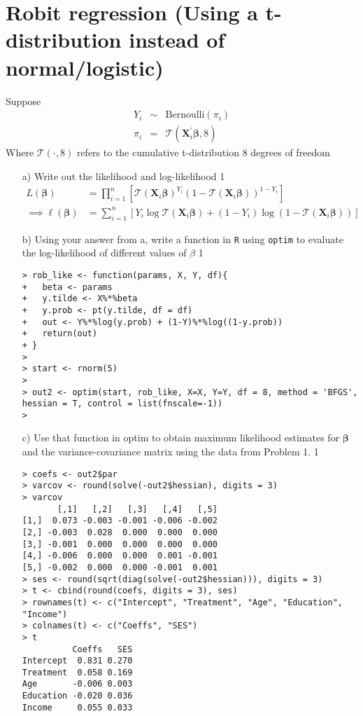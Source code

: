 \documentclass[letterpaper,12pt]{article}
\numberwithin{equation}{section}
\numberwithin{equation}{section}
\newcommand{\solutions}{1}
\begin{document}
\section{Robit regression (Using a t-distribution instead of normal/logistic) }
Suppose
\begin{eqnarray}
Y_{i} & \sim & \text{Bernoulli}(\pi_{i}) \nonumber \\
\pi_{i} & = & \mathcal{T}(\boldsymbol{X}_{i}^{'}\boldsymbol{\beta}, 8) \nonumber
\end{eqnarray}
Where $\mathcal{T}(\cdot, 8)$ refers to the cumulative t-distribution 8 degrees of freedom
\begin{itemize}
\item[a)] Write out the likelihood and log-likelihood
\if\solutions1
{\color{red}
\begin{align*}
  L(\bm \beta)
  &= \prod_{i=1}^n \left[ \mathcal{T}(\bm X_i \bm \beta)^{Y_i} \left(1 - \mathcal{T}(\bm X_i \bm \beta) \right)^{1 - Y_i}  \right]
  \\
  \implies \ell(\bm \beta)
  &= \sum_{i=1}^n \left[ Y_i \log\mathcal{T}(\bm X_i \bm \beta) + (1 - Y_i)\log\left(1 - \mathcal{T}(\bm X_i \bm \beta) \right)\right]
\end{align*}
}
\fi
\item[b)] Using your answer from a, write a function in {\tt R} using {\tt optim} to evaluate the log-likelihood of different values of $\beta$
\if \solutions1
{\color{red}
\begin{verbatim}
> rob_like <- function(params, X, Y, df){
+   beta <- params
+   y.tilde <- X%*%beta
+   y.prob <- pt(y.tilde, df = df) 
+   out <- Y%*%log(y.prob) + (1-Y)%*%log((1-y.prob))
+   return(out)
+ }
> 
> start <- rnorm(5)
> 
> out2 <- optim(start, rob_like, X=X, Y=Y, df = 8, method = 'BFGS', hessian = T, control = list(fnscale=-1))
> 
\end{verbatim}
}
\fi

\item[c)] Use that function in optim to obtain maximum likelihood estimates for $\boldsymbol{\beta}$ and the variance-covariance matrix using the data from Problem 1.
\if \solutions1
{\color{red}
\begin{verbatim}
> coefs <- out2$par
> varcov <- round(solve(-out2$hessian), digits = 3)
> varcov
       [,1]   [,2]   [,3]   [,4]   [,5]
[1,]  0.073 -0.003 -0.001 -0.006 -0.002
[2,] -0.003  0.028  0.000  0.000  0.000
[3,] -0.001  0.000  0.000  0.000  0.000
[4,] -0.006  0.000  0.000  0.001 -0.001
[5,] -0.002  0.000  0.000 -0.001  0.001
> ses <- round(sqrt(diag(solve(-out2$hessian))), digits = 3)
> t <- cbind(round(coefs, digits = 3), ses)
> rownames(t) <- c("Intercept", "Treatment", "Age", "Education", "Income")
> colnames(t) <- c("Coeffs", "SES")
> t
          Coeffs   SES
Intercept  0.831 0.270
Treatment  0.058 0.169
Age       -0.006 0.003
Education -0.020 0.036
Income     0.055 0.033
\end{verbatim}
}
\fi


\end{itemize}
\end{document}
